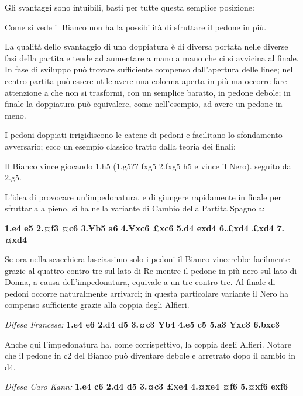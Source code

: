 Gli svantaggi sono intuibili, basti per tutte questa semplice posizione:


Come si vede il Bianco non ha la possibilità di sfruttare il pedone in
più.

La qualità dello svantaggio di una doppiatura è di diversa portata nelle
diverse fasi della partita e tende ad aumentare a mano a mano che ci si
avvicina al finale. In fase di sviluppo può trovare sufficiente compenso
dall'apertura delle linee; nel centro partita può essere utile avere una
colonna aperta in più ma occorre fare attenzione a che non si trasformi,
con un semplice baratto, in pedone debole; in finale la doppiatura può
equivalere, come nell'esempio, ad avere un pedone in meno.

I pedoni doppiati irrigidiscono le catene di pedoni e facilitano lo
sfondamento avversario; ecco un esempio classico tratto dalla teoria dei
finali:


Il Bianco vince giocando 1.h5 (1.g5?? fxg5 2.fxg5 h5 e vince il Nero).
seguito da 2.g5.

L'idea di provocare un'impedonatura, e di giungere rapidamente in finale
per sfruttarla a pieno, si ha nella variante di Cambio della Partita
Spagnola:

\textbf{1.e4 e5 2.¤f3 ¤c6 3.¥b5 a6 4.¥xc6 £xc6 5.d4 exd4 6.£xd4 £xd4
7.¤xd4}


Se ora nella scacchiera lasciassimo solo i pedoni il Bianco vincerebbe
facilmente grazie al quattro contro tre sul lato di Re mentre il pedone
in più nero sul lato di Donna, a causa dell'impedonatura, equivale a un
tre contro tre. Al finale di pedoni occorre naturalmente arrivarci; in
questa particolare variante il Nero ha compenso sufficiente grazie alla
coppia degli Alfieri.

\emph{Difesa Francese:} \textbf{1.e4 e6 2.d4 d5 3.¤c3 ¥b4 4.e5 c5 5.a3
¥xc3 6.bxc3}


Anche qui l'impedonatura ha, come corrispettivo, la coppia degli
Alfieri. Notare che il pedone in c2 del Bianco può diventare debole e
arretrato dopo il cambio in d4.

\emph{Difesa Caro Kann:} \textbf{1.e4 c6 2.d4 d5 3.¤c3 £xe4 4.¤xe4 ¤f6
5.¤xf6 exf6}

